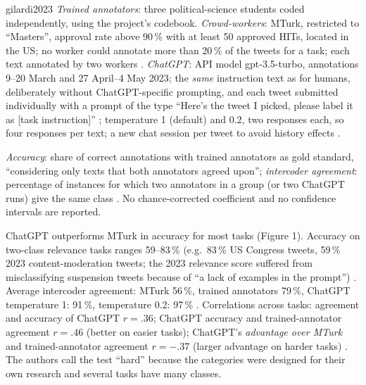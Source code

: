 \begin{papercard}{gilardi2023}
 \emph{Trained annotators}: three political-science students coded independently, using the project's codebook. \emph{Crowd-workers}: MTurk, restricted to ``Masters'', approval rate above 90\,\% with at least 50 approved HITs, located in the US; no worker could annotate more than 20\,\% of the tweets for a task; each text annotated by two workers . \emph{ChatGPT}: API model gpt-3.5-turbo, annotations 9--20 March and 27 April--4 May 2023; the \emph{same} instruction text as for humans, deliberately without ChatGPT-specific prompting, and each tweet submitted individually with a prompt of the type ``Here's the tweet I picked, please label it as [task instruction]'' ; temperature 1 (default) and 0.2, two responses each, so four responses per text; a new chat session per tweet to avoid history effects .

 \emph{Accuracy}: share of correct annotations with trained annotators as gold standard, ``considering only texts that both annotators agreed upon''; \emph{intercoder agreement}: percentage of instances for which two annotators in a group (or two ChatGPT runs) give the same class . No chance-corrected coefficient and no confidence intervals are reported.

 ChatGPT outperforms MTurk in accuracy for most tasks (Figure 1). Accuracy on two-class relevance tasks ranges 59--83\,\% (e.g.\ 83\,\% US Congress tweets, 59\,\% 2023 content-moderation tweets; the 2023 relevance score suffered from misclassifying suspension tweets because of ``a lack of examples in the prompt'') . Average intercoder agreement: MTurk 56\,\%, trained annotators 79\,\%, ChatGPT temperature 1: 91\,\%, temperature 0.2: 97\,\% . Correlations across tasks: agreement and accuracy of ChatGPT $r=.36$; ChatGPT accuracy and trained-annotator agreement $r=.46$ (better on easier tasks); ChatGPT's \emph{advantage over MTurk} and trained-annotator agreement $r=-.37$ (larger advantage on harder tasks) . The authors call the test ``hard'' because the categories were designed for their own research and several tasks have many classes.


\end{papercard}
